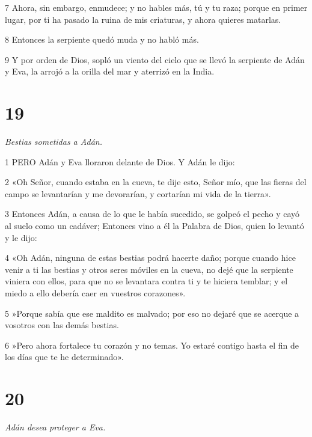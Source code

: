 \par 7 Ahora, sin embargo, enmudece; y no hables más, tú y tu raza; porque en primer lugar, por ti ha pasado la ruina de mis criaturas, y ahora quieres matarlas.

\par 8 Entonces la serpiente quedó muda y no habló más.

\par 9 Y por orden de Dios, sopló un viento del cielo que se llevó la serpiente de Adán y Eva, la arrojó a la orilla del mar y aterrizó en la India.

\chapter{19}

\par \textit{Bestias sometidas a Adán.}

\par 1 PERO Adán y Eva lloraron delante de Dios. Y Adán le dijo:

\par 2 «Oh Señor, cuando estaba en la cueva, te dije esto, Señor mío, que las fieras del campo se levantarían y me devorarían, y cortarían mi vida de la tierra».

\par 3 Entonces Adán, a causa de lo que le había sucedido, se golpeó el pecho y cayó al suelo como un cadáver; Entonces vino a él la Palabra de Dios, quien lo levantó y le dijo:

\par 4 «Oh Adán, ninguna de estas bestias podrá hacerte daño; porque cuando hice venir a ti las bestias y otros seres móviles en la cueva, no dejé que la serpiente viniera con ellos, para que no se levantara contra ti y te hiciera temblar; y el miedo a ello debería caer en vuestros corazones».

\par 5 »Porque sabía que ese maldito es malvado; por eso no dejaré que se acerque a vosotros con las demás bestias.

\par 6 »Pero ahora fortalece tu corazón y no temas. Yo estaré contigo hasta el fin de los días que te he determinado».

\chapter{20}

\par \textit{Adán desea proteger a Eva.}

